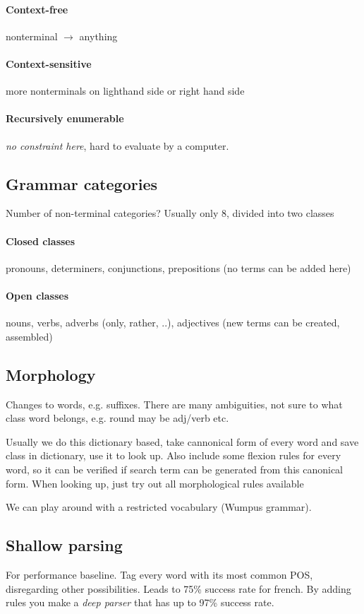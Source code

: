 \documentclass[11pt]{article}
\begin{document}
\paragraph{Context-free} nonterminal $\rightarrow$ anything
\paragraph{Context-sensitive} more nonterminals on lighthand side or right hand side
\paragraph{Recursively enumerable} \emph{no constraint here}, hard to evaluate by a computer.

\subsection{Grammar categories}
Number of non-terminal categories? Usually only 8, divided into two classes
\paragraph{Closed classes} pronouns, determiners, conjunctions, prepositions (no terms can
be added here)
\paragraph{Open classes} nouns, verbs, adverbs (only, rather, ..), adjectives (new terms
can be created, assembled)

\subsection{Morphology}
Changes to words, e.g. suffixes. There are many ambiguities, not sure to what class
word belongs, e.g. round may be adj/verb etc.

Usually we do this dictionary based, take cannonical form of every word and save class in
dictionary, use it to look up. Also include some flexion rules for every word, so it can
be verified if search term can be generated from this canonical form. When looking up, just
try out all morphological rules available

We can play around with a restricted vocabulary (Wumpus grammar). 

\subsection{Shallow parsing}
For performance baseline. Tag every word with its most common POS, disregarding other
possibilities. Leads to 75\% success rate for french. By adding rules you make
a \emph{deep parser} that has up to 97\% success rate.
\end{document}
